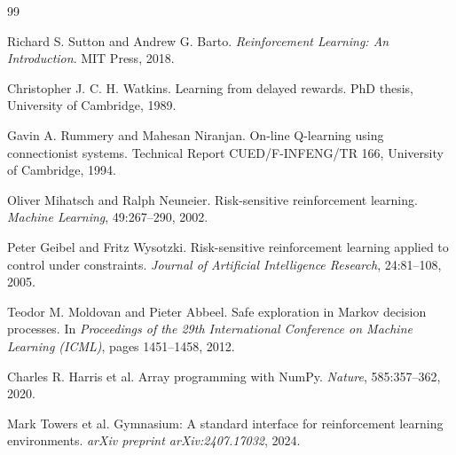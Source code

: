 \documentclass{article}
\begin{document}
\newpage
\begin{thebibliography}{99}

Richard S. Sutton and Andrew G. Barto.
\newblock \textit{Reinforcement Learning: An Introduction}.
\newblock MIT Press, 2018.

Christopher J. C. H. Watkins.
\newblock Learning from delayed rewards.
\newblock PhD thesis, University of Cambridge, 1989.

Gavin A. Rummery and Mahesan Niranjan.
\newblock On-line Q-learning using connectionist systems.
\newblock Technical Report CUED/F-INFENG/TR 166, University of Cambridge, 1994.

Oliver Mihatsch and Ralph Neuneier.
\newblock Risk-sensitive reinforcement learning.
\newblock \textit{Machine Learning}, 49:267--290, 2002.

Peter Geibel and Fritz Wysotzki.
\newblock Risk-sensitive reinforcement learning applied to control under constraints.
\newblock \textit{Journal of Artificial Intelligence Research}, 24:81--108, 2005.

Teodor M. Moldovan and Pieter Abbeel.
\newblock Safe exploration in Markov decision processes.
\newblock In \textit{Proceedings of the 29th International Conference on Machine Learning (ICML)}, pages 1451--1458, 2012.

Charles R. Harris et al.
\newblock Array programming with {NumPy}.
\newblock \textit{Nature}, 585:357--362, 2020.

Mark Towers et al.
\newblock Gymnasium: A standard interface for reinforcement learning environments.
\newblock \textit{arXiv preprint arXiv:2407.17032}, 2024.

\end{thebibliography}
\end{document}
